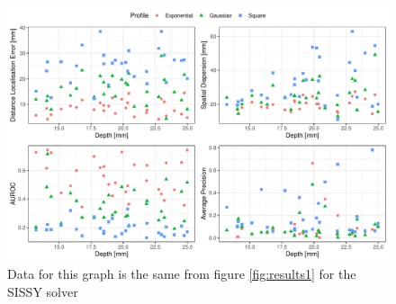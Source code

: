 \begin{figure}
    \centering
    \includegraphics[width=0.95\linewidth]{img_stats/SISSY_scatter_EvalMetrics_Protocol04_30.pdf}
    \caption{Data for this graph is the same from figure \ref{fig:results1} for the SISSY solver}
    \label{fig:deets_SISSY}
\end{figure}

